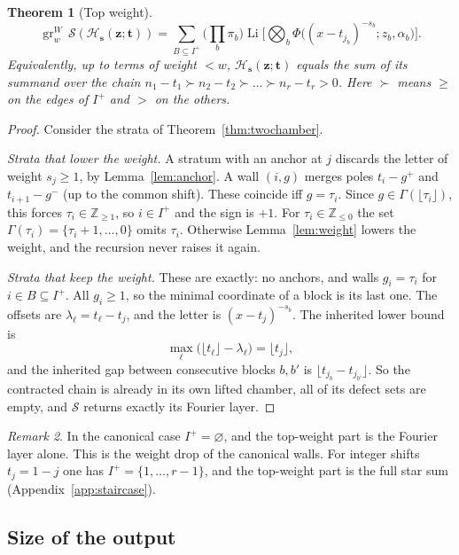\documentclass[11pt]{amsart}
\newtheorem{theorem}{Theorem}[section]
\theoremstyle{definition}
\theoremstyle{remark}
\newtheorem{remark}[theorem]{Remark}
\numberwithin{equation}{section}
\newcommand{\Z}{\mathbb{Z}}
\newcommand{\Li}{\operatorname{Li}}
\newcommand{\cS}{\mathcal{S}}
\newcommand{\gr}{\operatorname{gr}}
\newcommand{\s}{\mathbf{s}}
\newcommand{\z}{\mathbf{z}}
\newcommand{\tb}{\mathbf{t}}
\newcommand{\Hs}{\mathcal{H}}
\newcommand{\lfl}{\lfloor}
\newcommand{\rfl}{\rfloor}
\begin{document}
\begin{theorem}[Top weight]\label{thm:topweight}
\[
\gr^W_w\,\cS(\Hs_\s(\z;\tb))=\sum_{B\subseteq I^+}\Big(\prod_b\pi_b\Big)\Li\Big[\bigotimes_b\Phi\big((x-t_{j_b})^{-s_b};z_b,\alpha_b\big)\Big].
\]
Equivalently, up to terms of weight $<w$, $\Hs_\s(\z;\tb)$ equals the sum of its summand over the chain $n_1-t_1\succ n_2-t_2\succ\dots\succ n_r-t_r>0$. Here $\succ$ means $\ge$ on the edges of $I^+$ and $>$ on the others.
\end{theorem}

\begin{proof}
Consider the strata of Theorem~\ref{thm:twochamber}.

\emph{Strata that lower the weight.} A stratum with an anchor at $j$ discards the letter of weight $s_j\ge1$, by Lemma~\ref{lem:anchor}. A wall $(i,g)$ merges poles $t_i-g^+$ and $t_{i+1}-g^-$ (up to the common shift). These coincide iff $g=\tau_i$. Since $g\in\Gamma(\lfl\tau_i\rfl)$, this forces $\tau_i\in\Z_{\ge1}$, so $i\in I^+$ and the sign is $+1$. For $\tau_i\in\Z_{\le0}$ the set $\Gamma(\tau_i)=\{\tau_i+1,\dots,0\}$ omits $\tau_i$. Otherwise Lemma~\ref{lem:weight} lowers the weight, and the recursion never raises it again.

\emph{Strata that keep the weight.} These are exactly: no anchors, and walls $g_i=\tau_i$ for $i\in B\subseteq I^+$. All $g_i\ge1$, so the minimal coordinate of a block is its last one. The offsets are $\lambda_\ell=t_\ell-t_j$, and the letter is $(x-t_j)^{-s_b}$. The inherited lower bound is
\[
\max_\ell\big(\lfl t_\ell\rfl-\lambda_\ell\big)=\lfl t_j\rfl,
\]
and the inherited gap between consecutive blocks $b,b'$ is $\lfl t_{j_b}-t_{j_{b'}}\rfl$. So the contracted chain is already in its own lifted chamber, all of its defect sets are empty, and $\cS$ returns exactly its Fourier layer.
\end{proof}

\begin{remark}
In the canonical case $I^+=\varnothing$, and the top-weight part is the Fourier layer alone. This is the weight drop of the canonical walls. For integer shifts $t_j=1-j$ one has $I^+=\{1,\dots,r-1\}$, and the top-weight part is the full star sum (Appendix~\ref{app:staircase}).
\end{remark}

\subsection{Size of the output}
\end{document}
